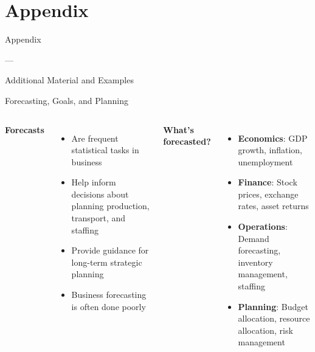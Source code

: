 \documentclass[11pt]{beamer}
\begin{document}




\appendix
\setcounter{framenumber}{0}

\section{Appendix}

\begin{frame}{}
	\begin{center}
		\Large
		Appendix

		---

		Additional Material and Examples
	\end{center}
\end{frame}


\begin{frame}{Forecasting, Goals, and Planning}
	\begin{columns}[T]
		\textbf{Forecasts}
		\begin{itemize}
			\item Are frequent statistical tasks in business
			\item Help inform decisions about planning production, transport, and staffing
			\item Provide guidance for long-term strategic planning
			\item Business forecasting is often done poorly %
		\end{itemize}

		\textbf{What's forecasted?}
		\begin{itemize}
			\item \textbf{Economics}: GDP growth, inflation, unemployment
			\item \textbf{Finance}: Stock prices, exchange rates, asset returns
			\item \textbf{Operations}: Demand forecasting, inventory management, staffing
			\item \textbf{Planning}: Budget allocation, resource allocation, risk management
		\end{itemize}
	\end{columns}
\end{frame}
\end{document}
